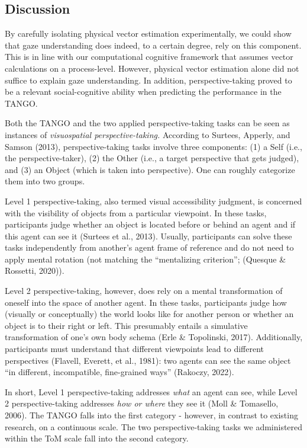 \documentclass[
  man,mask,floatsintext]{apa6}
\begin{document}
\hypertarget{discussion-2}{%
\subsection{Discussion}\label{discussion-2}}

By carefully isolating physical vector estimation experimentally, we could show that gaze understanding does indeed, to a certain degree, rely on this component. This is in line with our computational cognitive framework that assumes vector calculations on a process-level. However, physical vector estimation alone did not suffice to explain gaze understanding. In addition, perspective-taking proved to be a relevant social-cognitive ability when predicting the performance in the TANGO.

Both the TANGO and the two applied perspective-taking tasks can be seen as instances of \emph{visuospatial perspective-taking.} According to Surtees, Apperly, and Samson (2013), perspective-taking tasks involve three components: (1) a Self (i.e., the perspective-taker), (2) the Other (i.e., a target perspective that gets judged), and (3) an Object (which is taken into perspective).
One can roughly categorize them into two groups.

Level 1 perspective-taking, also termed visual accessibility judgment, is concerned with the visibility of objects from a particular viewpoint. In these tasks, participants judge whether an object is located before or behind an agent and if this agent can see it (Surtees et al., 2013). Usually, participants can solve these tasks independently from another's agent frame of reference and do not need to apply mental rotation (not matching the ``mentalizing criterion''; (Quesque \& Rossetti, 2020)).

Level 2 perspective-taking, however, does rely on a mental transformation of oneself into the space of another agent. In these tasks, participants judge how (visually or conceptually) the world looks like for another person or whether an object is to their right or left. This presumably entails a simulative transformation of one's own body schema (Erle \& Topolinski, 2017). Additionally, participants must understand that different viewpoints lead to different perspectives (Flavell, Everett, et al., 1981): two agents can see the same object ``in different, incompatible, fine-grained ways'' (Rakoczy, 2022).

In short, Level 1 perspective-taking addresses \emph{what} an agent can see, while Level 2 perspective-taking addresses \emph{how or where} they see it (Moll \& Tomasello, 2006). The TANGO falls into the first category - however, in contrast to existing research, on a continuous scale. The two perspective-taking tasks we administered within the ToM scale fall into the second category.
\end{document}
